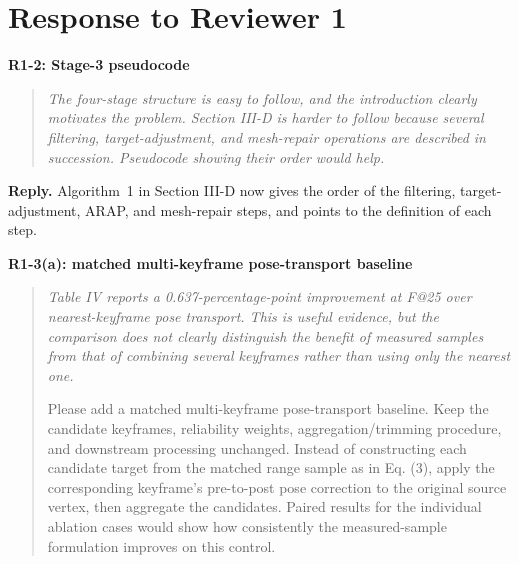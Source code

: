 \documentclass[11pt,a4paper]{article}
\newcommand{\point}[2]{\par\medskip\textbf{#1}\par\begin{quote}\itshape #2\end{quote}}
\newenvironment{reply}{\begingroup\color{replyblue}\textbf{Reply.} }{\par\endgroup}
\begin{document}
\section*{Response to Reviewer 1}
\point{R1-2: Stage-3 pseudocode}{The four-stage structure is easy to follow, and the introduction clearly motivates the problem. Section III-D is harder to follow because several filtering, target-adjustment, and mesh-repair operations are described in succession. Pseudocode showing their order would help.}
\begin{reply}
Algorithm~1 in Section III-D now gives the order of the filtering, target-adjustment, ARAP, and mesh-repair steps, and points to the definition of each step.
\end{reply}
\point{R1-3(a): matched multi-keyframe pose-transport baseline}{Table IV reports a 0.637-percentage-point improvement at F@25 over nearest-keyframe pose transport. This is useful evidence, but the comparison does not clearly distinguish the benefit of measured samples from that of combining several keyframes rather than using only the nearest one.

Please add a matched multi-keyframe pose-transport baseline. Keep the candidate keyframes, reliability weights, aggregation/trimming procedure, and downstream processing unchanged. Instead of constructing each candidate target from the matched range sample as in Eq. (3), apply the corresponding keyframe's pre-to-post pose correction to the original source vertex, then aggregate the candidates. Paired results for the individual ablation cases would show how consistently the measured-sample formulation improves on this control.}
\end{document}
